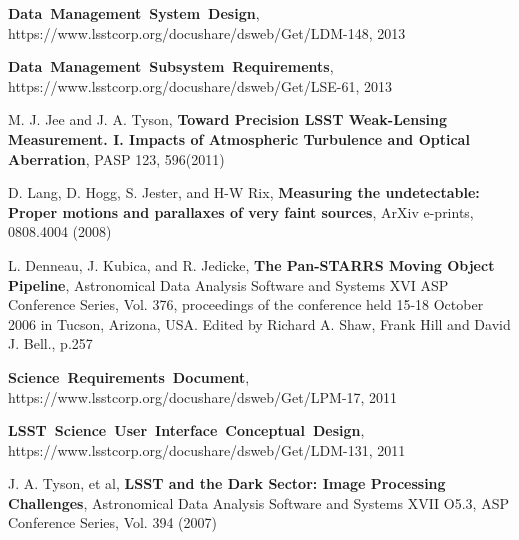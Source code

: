 \documentclass[12pt]{article}
\begin{document}
\begin{thebibliography}{10}

 \textbf{Data~Management~System~Design},\\ 
https://www.lsstcorp.org/docushare/dsweb/Get/LDM-148, 2013

  \textbf{Data~Management~Subsystem~Requirements},\\
  https://www.lsstcorp.org/docushare/dsweb/Get/LSE-61, 2013

 M. J. Jee and J. A. Tyson,  \textbf{Toward
  Precision LSST Weak-Lensing Measurement. I. Impacts of Atmospheric
  Turbulence and Optical Aberration}, PASP 123, 596(2011)

 D. Lang, D. Hogg, S. Jester, and H-W Rix,  \textbf{Measuring the undetectable: Proper motions and parallaxes of very faint sources}, ArXiv e-prints, 0808.4004 (2008)

 L. Denneau, J. Kubica, and R. Jedicke,
   \textbf{The Pan-STARRS Moving Object Pipeline}, Astronomical Data
  Analysis Software and Systems XVI ASP Conference Series, Vol. 376,
  proceedings of the conference held 15-18 October 2006 in Tucson,
  Arizona, USA. Edited by Richard A. Shaw, Frank Hill and David
  J. Bell., p.257

  \textbf{Science~Requirements~Document},\\
  https://www.lsstcorp.org/docushare/dsweb/Get/LPM-17, 2011 

  \textbf{LSST~Science~User~Interface~Conceptual~Design},\\
  https://www.lsstcorp.org/docushare/dsweb/Get/LDM-131, 2011

 J. A. Tyson, et al,  \textbf{LSST and the
  Dark Sector: Image Processing Challenges}, Astronomical Data
  Analysis Software and Systems XVII O5.3, ASP Conference Series,
  Vol. 394 (2007)

\end{thebibliography}
\end{document}
